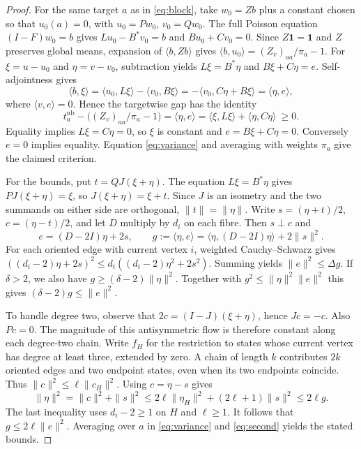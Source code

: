 \documentclass[11pt]{article}
\newcommand{\nb}{\mathrm{nb}}
\newcommand{\one}{\mathbf 1}
\newcommand{\ip}[2]{\langle #1,#2\rangle}
\begin{document}
\begin{proof}
For the same target $a$ as in \eqref{eq:block}, take $w_0=Zb$ plus a
constant chosen so that $u_0(a)=0$, with $u_0=Pw_0$, $v_0=Qw_0$.
The full Poisson equation $(I-F)w_0=b$ gives
$Lu_0-B^*v_0=b$ and $Bu_0+Cv_0=0$.
Since $Z\one=\one$ and $Z$ preserves global means, expansion of
$\ip b{Zb}$ gives $\ip b{u_0}=(Z_v)_{aa}/\pi_a-1$.
For $\xi=u-u_0$ and $\eta=v-v_0$, subtraction yields
$L\xi=B^*\eta$ and $B\xi+C\eta=e$. Self-adjointness gives
\[
 \ip b\xi=\ip{u_0}{L\xi}-\ip{v_0}{B\xi}
         =-\ip{v_0}{C\eta+B\xi}
         =\ip\eta e ,
\]
where $\ip v e=0$. Hence the targetwise gap has the identity
\begin{equation}\label{eq:second}
 t^\nb_a-\big((Z_v)_{aa}/\pi_a-1\big)
   =\ip\eta e=\ip\xi{L\xi}+\ip\eta{C\eta}\ \ge0 .
\end{equation}
Equality implies $L\xi=C\eta=0$, so $\xi$ is constant and
$e=B\xi+C\eta=0$. Conversely $e=0$ implies equality. Equation
\eqref{eq:variance} and averaging with weights $\pi_a$ give the
claimed criterion.

For the bounds, put $t=QJ(\xi+\eta)$. The equation $L\xi=B^*\eta$
gives $PJ(\xi+\eta)=\xi$, so $J(\xi+\eta)=\xi+t$. Since $J$ is an
isometry and the two summands on either side are orthogonal,
$\|t\|=\|\eta\|$. Write $s=(\eta+t)/2$, $c=(\eta-t)/2$, and let $D$
multiply by $d_i$ on each fibre. Then $s\perp c$ and
\[
 e=(D-2I)\eta+2s,\qquad
 g:=\ip\eta e=\ip\eta{(D-2I)\eta}+2\|s\|^2 .
\]
For each oriented edge with current vertex $i$, weighted Cauchy--Schwarz
gives $((d_i-2)\eta+2s)^2\le d_i((d_i-2)\eta^2+2s^2)$.
Summing yields $\|e\|^2\le\Delta g$. If $\delta>2$, we also have
$g\ge(\delta-2)\|\eta\|^2$. Together with
$g^2\le\|\eta\|^2\|e\|^2$ this gives $(\delta-2)g\le\|e\|^2$.

To handle degree two, observe that $2c=(I-J)(\xi+\eta)$, hence
$Jc=-c$. Also $Pc=0$. The magnitude of this antisymmetric flow is
therefore constant along each degree-two chain. Write $f_H$ for the
restriction to states whose current vertex has degree at least three,
extended by zero. A chain of length $k$ contributes $2k$ oriented edges
and two endpoint states, even when its two endpoints coincide. Thus
$\|c\|^2\le\ell\|c_H\|^2$. Using $c=\eta-s$ gives
\[
 \|\eta\|^2=\|c\|^2+\|s\|^2
 \le 2\ell\|\eta_H\|^2+(2\ell+1)\|s\|^2\le 2\ell g .
\]
The last inequality uses $d_i-2\ge1$ on $H$ and $\ell\ge1$.
It follows that $g\le2\ell\|e\|^2$. Averaging over $a$ in
\eqref{eq:variance} and \eqref{eq:second} yields the stated bounds.
\end{proof}
\end{document}
